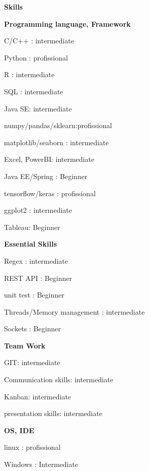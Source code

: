 \documentclass[a4paper,13pt,final]{memoir}
\newcommand{\Sep}{\vspace{1.5em}}
\newcommand{\SmallSep}{\vspace{0.5em}}
\newcommand{\CVSection}[1]
	{\Large\textbf{#1}\par
	\SmallSep\normalsize\normalfont}
\newcommand{\CVItem}[1]
	{\textbf{\color{RoyalBlue} #1}}
\begin{document}
\CVSection{Skills}
\CVItem{Programming language, Framework}
\begin{multicols}{3}
\begin{compactitem}[\color{RoyalBlue}$\circ$]
	\item C/C++ : intermediate
	\item Python : profissional
	\item R : intermediate
	\item SQL :  intermediate
	\item Java SE: intermediate
	\item numpy/pandas/sklearn:profissional
	\item matplotlib/seaborn : intermediate
	\item Excel, PowerBI: intermediate
	\item Java EE/Spring : Beginner
	\item tensorflow/keras : profissional
	\item ggplot2 : intermediate
	\item Tableau: Beginner
\end{compactitem}
\end{multicols}
\SmallSep

\CVItem{Essential Skills}
\begin{multicols}{2}
\begin{compactitem}[\color{RoyalBlue}$\circ$]
	\item Regex : intermediate
	\item REST API : Beginner
	\item unit test : Beginner
	\item Threads/Memory management : intermediate
	\item Sockets : Beginner
\end{compactitem}
\end{multicols}
\SmallSep


\CVItem{Team Work}
\begin{multicols}{2}
\begin{compactitem}[\color{RoyalBlue}$\circ$]
	\item GIT: intermediate
	\item Communication skills: intermediate
	\item Kanban: intermediate
	\item presentation skills: intermediate
\end{compactitem}
\end{multicols}
\SmallSep

\CVItem{OS, IDE}
\begin{multicols}{2}
\begin{compactitem}[\color{RoyalBlue}$\circ$]
	\item linux : profissional
	\item Windows : Intermediate
\end{compactitem}
\end{multicols}
\Sep
\end{document}
